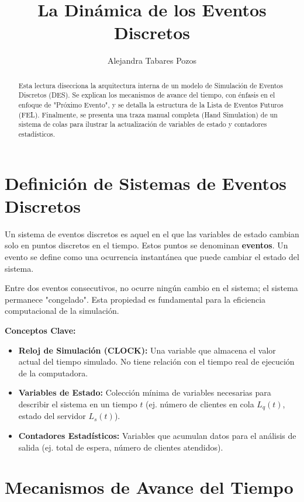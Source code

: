 \documentclass[11pt, letterpaper]{article}
\title{La Dinámica de los Eventos Discretos}
\author{Alejandra Tabares Pozos}
\date{}
\begin{document}
\maketitle
\tableofcontents
\newpage

\begin{abstract}
Esta lectura disecciona la arquitectura interna de un modelo de Simulación de Eventos Discretos (DES). Se explican los mecanismos de avance del tiempo, con énfasis en el enfoque de "Próximo Evento", y se detalla la estructura de la Lista de Eventos Futuros (FEL). Finalmente, se presenta una traza manual completa (Hand Simulation) de un sistema de colas para ilustrar la actualización de variables de estado y contadores estadísticos.
\end{abstract}

\section{Definición de Sistemas de Eventos Discretos}

Un sistema de eventos discretos es aquel en el que las variables de estado cambian solo en puntos discretos en el tiempo. Estos puntos se denominan \textbf{eventos}. Un evento se define como una ocurrencia instantánea que puede cambiar el estado del sistema.

Entre dos eventos consecutivos, no ocurre ningún cambio en el sistema; el sistema permanece "congelado". Esta propiedad es fundamental para la eficiencia computacional de la simulación.

\textbf{Conceptos Clave:}
\begin{itemize}
    \item \textbf{Reloj de Simulación (CLOCK):} Una variable que almacena el valor actual del tiempo simulado. No tiene relación con el tiempo real de ejecución de la computadora.
    \item \textbf{Variables de Estado:} Colección mínima de variables necesarias para describir el sistema en un tiempo $t$ (ej. número de clientes en cola $L_q(t)$, estado del servidor $L_s(t)$).
    \item \textbf{Contadores Estadísticos:} Variables que acumulan datos para el análisis de salida (ej. total de espera, número de clientes atendidos).
\end{itemize}

\section{Mecanismos de Avance del Tiempo}
\end{document}
